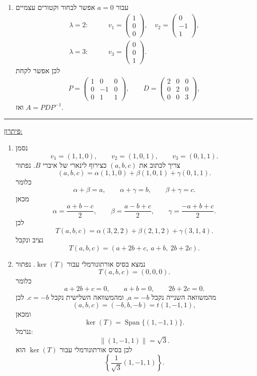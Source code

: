 \documentclass[12pt, a4paper]{article}
\DeclareMathOperator{\Span}{Span}
\begin{document}
\begin{enumerate}
\begin{enumerate}
\item עבור
$a=0$
אפשר לבחור וקטורים עצמיים
\begin{align*}
\lambda=2:&\qquad
v_1=\begin{pmatrix}1\\0\\0\end{pmatrix},\quad
v_2=\begin{pmatrix}0\\-1\\1\end{pmatrix},\\
\lambda=3:&\qquad
v_3=\begin{pmatrix}0\\0\\1\end{pmatrix}.
\end{align*}
לכן אפשר לקחת
\begin{align*}
P=
\begin{pmatrix}
1&0&0\\
0&-1&0\\
0&1&1
\end{pmatrix},
\qquad
D=
\begin{pmatrix}
2&0&0\\
0&2&0\\
0&0&3
\end{pmatrix},
\end{align*}
ואז
$A=PDP^{-1}$.
\end{enumerate}

    \pagebreak

    \secondQ
    \noindent\rule{\textwidth-30pt}{0.4pt}
    \underline{פיתרון:}

\begin{enumerate}
\item
נסמן
$$
v_1=(1,1,0),
\qquad
v_2=(1,0,1),
\qquad
v_3=(0,1,1).
$$
צריך לכתוב את
$(a,b,c)$
כצירוף לינארי של איברי
$B$.
נפתור
$$
(a,b,c)
=
\alpha(1,1,0)+\beta(1,0,1)+\gamma(0,1,1).
$$
כלומר
$$
\alpha+\beta=a,
\qquad
\alpha+\gamma=b,
\qquad
\beta+\gamma=c.
$$
מכאן
$$
\alpha=\frac{a+b-c}{2},
\qquad
\beta=\frac{a-b+c}{2},
\qquad
\gamma=\frac{-a+b+c}{2}.
$$
לכן
$$
T(a,b,c)
=
\alpha(3,2,2)+\beta(2,1,2)+\gamma(3,1,4).
$$
נציב ונקבל
$$
T(a,b,c)
=
(a+2b+c,\ a+b,\ 2b+2c).
$$

\item
נמצא בסיס אורתונורמלי עבור
$\ker(T)$.
נפתור
$$
T(a,b,c)=(0,0,0).
$$
כלומר
$$
a+2b+c=0,
\qquad
a+b=0,
\qquad
2b+2c=0.
$$
מהמשוואה השנייה נקבל
$a=-b$,
ומהמשוואה השלישית נקבל
$c=-b$.
לכן
$$
(a,b,c)=(-b,b,-b)=t(1,-1,1),
$$
ומכאן
$$
\ker(T)=\Span\{(1,-1,1)\}.
$$
ננרמל:
$$
\|(1,-1,1)\|=\sqrt{3}.
$$
לכן בסיס אורתונורמלי עבור
$\ker(T)$
הוא
$$
\boxed{
\left\{
\frac{1}{\sqrt{3}}(1,-1,1)
\right\}
}.
$$


\end{enumerate}
\end{enumerate}
\end{document}
